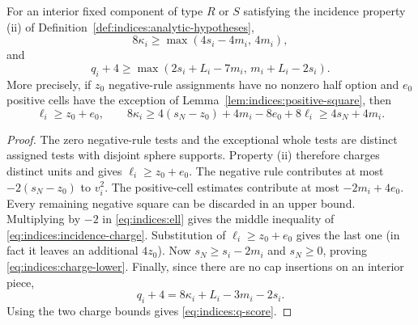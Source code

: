 \begin{lemma}\label{lem:indices:component-score}
For an interior fixed component of type $R$ or $S$ satisfying the
incidence property (ii) of
Definition~\ref{def:indices:analytic-hypotheses},
\begin{equation}\label{eq:indices:charge-lower}
 8\kappa_i\ge\max(4s_i-4m_i,\,4m_i),
\end{equation}
and
\begin{equation}\label{eq:indices:q-score}
 q_i+4\ge
 \max(2s_i+L_i-7m_i,\,m_i+L_i-2s_i).
\end{equation}
More precisely, if $z_0$ negative-rule assignments have no nonzero half
option and $e_0$ positive cells have the exception of
Lemma~\ref{lem:indices:positive-square}, then
\begin{equation}\label{eq:indices:incidence-charge}
 \ell_i\ge z_0+e_0,\qquad
 8\kappa_i\ge
 4(s_N-z_0)+4m_i-8e_0+8\ell_i
 \ge4s_N+4m_i.
\end{equation}
\end{lemma}
\begin{proof}
The zero negative-rule tests and the exceptional whole tests are distinct
assigned tests with disjoint sphere supports.  Property (ii) therefore
charges distinct units and gives $\ell_i\ge z_0+e_0$.
The negative rule contributes at most $-2(s_N-z_0)$ to $v_i^2$.
The positive-cell estimates contribute at most $-2m_i+4e_0$.
Every remaining negative square can be discarded in an upper bound.
Multiplying by $-2$ in \eqref{eq:indices:ell} gives the middle inequality
of \eqref{eq:indices:incidence-charge}.  Substitution of
$\ell_i\ge z_0+e_0$ gives the last one (in fact it leaves an additional
$4z_0$).  Now $s_N\ge s_i-2m_i$ and $s_N\ge0$, proving
\eqref{eq:indices:charge-lower}.  Finally, since there are no cap
insertions on an interior piece,
\[
 q_i+4=8\kappa_i+L_i-3m_i-2s_i.
\]
Using the two charge bounds gives \eqref{eq:indices:q-score}.
\end{proof}


